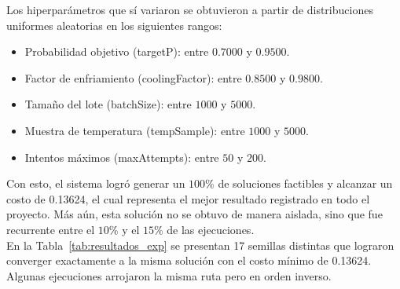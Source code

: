\documentclass[9pt,a4paper,twocolumn,twoside]{rho-class/rho}
\begin{document}
Los hiperparámetros que sí variaron se obtuvieron a partir de distribuciones uniformes aleatorias en
los siguientes rangos:
\begin{itemize}
    \item Probabilidad objetivo (targetP): entre $0.7000$ y $0.9500$.
    \item Factor de enfriamiento (coolingFactor): entre $0.8500$ y $0.9800$.
    \item Tamaño del lote (batchSize): entre $1000$ y $5000$.
    \item Muestra de temperatura (tempSample): entre $1000$ y $5000$.
    \item Intentos máximos (maxAttempts): entre $50$ y $200$.
\end{itemize}

Con esto, el sistema logró generar un \(100\%\) de soluciones factibles y alcanzar un costo de 0.13624,
el cual representa el mejor resultado registrado en todo el proyecto. Más aún, esta solución no se
obtuvo de manera aislada, sino que fue recurrente entre el \(10\%\) y el \(15\%\) de las ejecuciones.  \\

En la Tabla~\ref{tab:resultados_exp} se presentan 17 semillas distintas que lograron converger
exactamente a la misma solución con el costo mínimo de 0.13624. Algunas ejecuciones arrojaron la misma
ruta pero en orden inverso.
\end{document}
